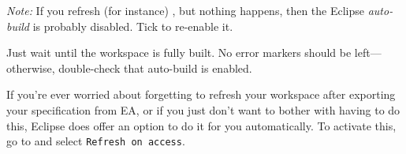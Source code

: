 \begin{stepbystep}
\emph{Note:} If you refresh (for instance) , but nothing happens, then the Eclipse \emph{auto-build} is probably disabled.
Tick  to re-enable it.
%
\item
Just wait until the workspace is fully built.
No error markers should be left---otherwise, double-check that auto-build is enabled.
%
\item
If you're ever worried about forgetting to refresh your workspace after exporting your specification from EA, or if you just don't want to bother with having to do this,
Eclipse does offer an option to do it for you automatically. To activate this, go to  and select \texttt{Refresh on access}.

\end{stepbystep}


